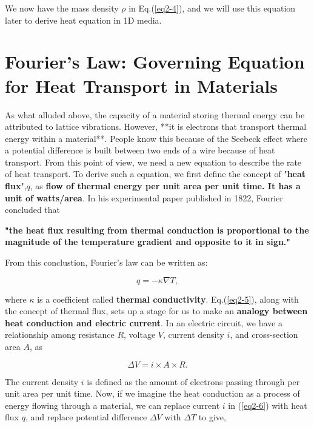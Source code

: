 We now have the mass density $\rho$ in Eq.(\ref{eq2-4}), and we will use this equation later to derive heat equation in 1D media.

\section{Fourier's Law: Governing Equation for Heat Transport in Materials}

As what alluded above, the capacity of a material storing thermal energy can be attributed to lattice vibrations. However, **it is electrons that transport thermal energy within a material**. People know this because of the Seebeck effect where a potential difference is built between two ends of a wire because of heat transport. From this point of view, we need a new equation to describe the rate of heat transport. To derive such a equation, we first define the concept of "\textbf{heat flux}",$q$, as \textbf{flow of thermal energy per unit area per unit time. It has a unit of watts/area}. In his experimental paper published in 1822, Fourier concluded that 

\begin{docspec}
    \textbf{"the heat flux resulting from thermal conduction is proportional to the magnitude of the temperature gradient and opposite to it in sign."}
\end{docspec}

From this conclustion, Fourier's law can be written as:

\begin{equation}
    q=-\kappa\nabla T,
    \label{eq2-5}
\end{equation}

where $\kappa$ is a coefficient called \textbf{thermal conductivity}. Eq.(\ref{eq2-5}), along with the concept of thermal flux, sets up a stage for us to make an \textbf{analogy between heat conduction and electric current}. In an electric circuit, we have a relationship among resistance $R$, voltage $V$, current density $i$, and cross-section area $A$, as

\begin{equation}
    \Delta V=i\times A\times R.
    \label{eq2-6}
\end{equation}

The current density $i$ is defined as the amount of electrons passing through per unit area per unit time. Now, if we imagine the heat conduction as a process of energy flowing through a material, we can replace current $i$ in (\ref{eq2-6}) with heat flux $q$, and replace potential difference $\Delta V$ with $\Delta T$ to give,

